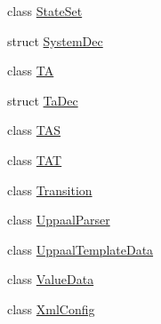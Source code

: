 \begin{DoxyCompactItemize}
\item 
class \mbox{\hyperlink{classgraphsat_1_1_state_set}{State\+Set}}
\item 
struct \mbox{\hyperlink{structgraphsat_1_1_system_dec}{System\+Dec}}
\item 
class \mbox{\hyperlink{classgraphsat_1_1_t_a}{TA}}
\item 
struct \mbox{\hyperlink{structgraphsat_1_1_ta_dec}{Ta\+Dec}}
\item 
class \mbox{\hyperlink{classgraphsat_1_1_t_a_s}{T\+AS}}
\item 
class \mbox{\hyperlink{classgraphsat_1_1_t_a_t}{T\+AT}}
\item 
class \mbox{\hyperlink{classgraphsat_1_1_transition}{Transition}}
\item 
class \mbox{\hyperlink{classgraphsat_1_1_uppaal_parser}{Uppaal\+Parser}}
\item 
class \mbox{\hyperlink{classgraphsat_1_1_uppaal_template_data}{Uppaal\+Template\+Data}}
\item 
class \mbox{\hyperlink{classgraphsat_1_1_value_data}{Value\+Data}}
\item 
class \mbox{\hyperlink{classgraphsat_1_1_xml_config}{Xml\+Config}}
\end{DoxyCompactItemize}
